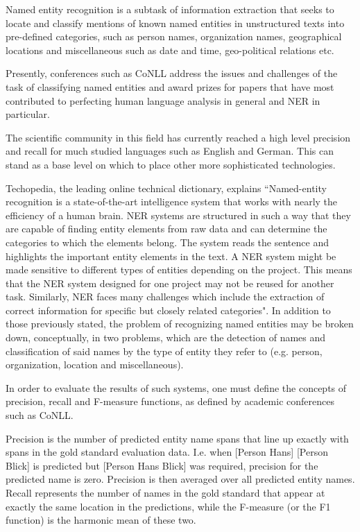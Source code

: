 \documentclass[12pt,a4paper]{article}
\begin{document}
\qquad	Named entity recognition is a subtask of information extraction that seeks to locate and classify mentions of known named entities in unstructured texts into pre-defined categories, such as person names, organization names, geographical locations and miscellaneous such as date and time, geo-political relations etc.

\qquad	Presently, conferences such as CoNLL address the issues and challenges of the task of classifying named entities and award prizes for papers that have most contributed to perfecting human language analysis in general and NER in particular.

\qquad	The scientific community in this field has currently reached a high level precision and recall for much studied languages such as English and German. This can stand as a base level on which to place other more sophisticated technologies. 

\qquad	Techopedia, the leading online technical dictionary, explains “Named-entity recognition is a state-of-the-art intelligence system that works with nearly the efficiency of a human brain. NER systems are structured in such a way that they are capable of finding entity elements from raw data and can determine the categories to which the elements belong. The system reads the sentence and highlights the important entity elements in the text. A NER system might be made sensitive to different types of entities depending on the project. This means that the NER system designed for one project may not be reused for another task. Similarly, NER faces many challenges which include the extraction of correct information for specific but closely related categories". In addition to those previously stated, the problem of recognizing named entities may be broken down, conceptually, in two problems, which are the detection of names and classification of said names by the type of entity they refer to (e.g. person, organization, location and miscellaneous). 

\qquad	In order to evaluate the results of such systems, one must define the concepts of precision, recall and F-measure functions, as defined by academic conferences such as CoNLL.

\qquad	Precision is the number of predicted entity name spans that line up exactly with spans in the gold standard evaluation data. I.e. when [Person Hans] [Person Blick] is predicted but [Person Hans Blick] was required, precision for the predicted name is zero. Precision is then averaged over all predicted entity names. Recall represents the number of names in the gold standard that appear at exactly the same location in the predictions, while the F-measure (or the F1 function) is the harmonic mean of these two.
\end{document}
